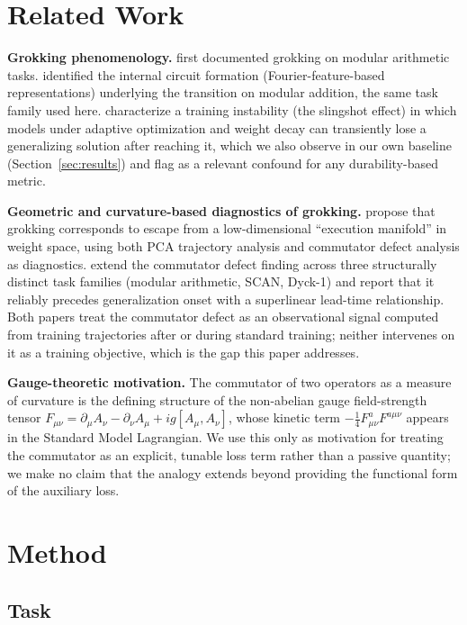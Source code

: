 \documentclass[11pt]{article}
\begin{document}
\section{Related Work}

\textbf{Grokking phenomenology.} \citet{power2022grokking} first
documented grokking on modular arithmetic tasks. \citet{nanda2023progress}
identified the internal circuit formation (Fourier-feature-based
representations) underlying the transition on modular addition, the same
task family used here. \citet{thilak2022slingshot} characterize a
training instability (the slingshot effect) in which models under
adaptive optimization and weight decay can transiently lose a generalizing
solution after reaching it, which we also observe in our own baseline
(Section~\ref{sec:results}) and flag as a relevant confound for any
durability-based metric.

\textbf{Geometric and curvature-based diagnostics of grokking.}
\citet{xu2026a} propose that grokking corresponds to escape from a
low-dimensional ``execution manifold'' in weight space, using both PCA
trajectory analysis and commutator defect analysis as diagnostics.
\citet{xu2026b} extend the commutator defect finding across three
structurally distinct task families (modular arithmetic, SCAN, Dyck-1)
and report that it reliably precedes generalization onset with a
superlinear lead-time relationship. Both papers treat the commutator
defect as an observational signal computed from training trajectories
after or during standard training; neither intervenes on it as a training
objective, which is the gap this paper addresses.

\textbf{Gauge-theoretic motivation.} The commutator of two operators as a
measure of curvature is the defining structure of the non-abelian gauge
field-strength tensor $F_{\mu\nu} = \partial_\mu A_\nu - \partial_\nu
A_\mu + ig[A_\mu, A_\nu]$, whose kinetic term $-\tfrac{1}{4}F^a_{\mu\nu}
F^{a\mu\nu}$ appears in the Standard Model Lagrangian. We use this only as
motivation for treating the commutator as an explicit, tunable loss term
rather than a passive quantity; we make no claim that the analogy extends
beyond providing the functional form of the auxiliary loss.

\section{Method}

\subsection{Task}
\end{document}

